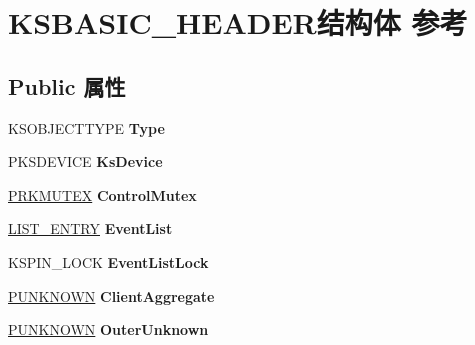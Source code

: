\hypertarget{struct_k_s_b_a_s_i_c___h_e_a_d_e_r}{}\section{K\+S\+B\+A\+S\+I\+C\+\_\+\+H\+E\+A\+D\+E\+R结构体 参考}
\label{struct_k_s_b_a_s_i_c___h_e_a_d_e_r}
\subsection*{Public 属性}
\begin{DoxyCompactItemize}
\item 
\mbox{\label{struct_k_s_b_a_s_i_c___h_e_a_d_e_r_a996f5ed3ccd5ee38523b8e1892564e11}} 
K\+S\+O\+B\+J\+E\+C\+T\+T\+Y\+PE {\bfseries Type}
\item 
\mbox{\label{struct_k_s_b_a_s_i_c___h_e_a_d_e_r_a479d8a22c14d91ff68177d6f73b9de17}} 
P\+K\+S\+D\+E\+V\+I\+CE {\bfseries Ks\+Device}
\item 
\mbox{\label{struct_k_s_b_a_s_i_c___h_e_a_d_e_r_a72c2b586af2bdab5b895d9228fdafe14}} 
\hyperlink{struct___k_m_u_t_a_n_t}{P\+R\+K\+M\+U\+T\+EX} {\bfseries Control\+Mutex}
\item 
\mbox{\label{struct_k_s_b_a_s_i_c___h_e_a_d_e_r_a4385de226b599f7eaf6a069ca8843259}} 
\hyperlink{struct___l_i_s_t___e_n_t_r_y}{L\+I\+S\+T\+\_\+\+E\+N\+T\+RY} {\bfseries Event\+List}
\item 
\mbox{\label{struct_k_s_b_a_s_i_c___h_e_a_d_e_r_af6bfdc07aea2910db9d6aa81c10762ec}} 
K\+S\+P\+I\+N\+\_\+\+L\+O\+CK {\bfseries Event\+List\+Lock}
\item 
\mbox{\label{struct_k_s_b_a_s_i_c___h_e_a_d_e_r_a1aea52f10fd41079cb43fbd28d05c963}} 
\hyperlink{interface_i_unknown}{P\+U\+N\+K\+N\+O\+WN} {\bfseries Client\+Aggregate}
\item 
\mbox{\label{struct_k_s_b_a_s_i_c___h_e_a_d_e_r_a4141be30f9721f29e593b298b1023df0}} 
\hyperlink{interface_i_unknown}{P\+U\+N\+K\+N\+O\+WN} {\bfseries Outer\+Unknown}

\end{DoxyCompactItemize}
